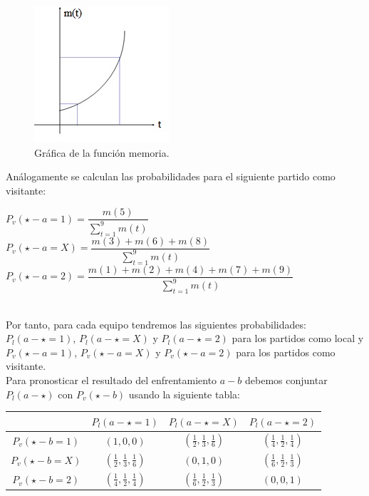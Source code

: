\begin{figure}[htb]
	\centering
	\includegraphics{images/memoria.jpg}
	\caption{Gráfica de la función memoria.} \label{fig:memoria}
\end{figure}
Análogamente se calculan las probabilidades para el siguiente partido como visitante:
\begin{center}
	$P_{v}(\star - a=1)=\dfrac{m(5)}{\sum_{t=1}^{9}m(t)}$ \ \ \ \
	$P_{v}(\star - a=X)=\dfrac{m(3)+m(6)+m(8)}{\sum_{t=1}^{9}m(t)}$\\
	$P_{v}(\star - a=2)=\dfrac{m(1)+m(2)+m(4)+m(7)+m(9)}{\sum_{t=1}^{9}m(t)}$
\end{center}
\ \\
Por tanto, para cada equipo tendremos las siguientes probabilidades:\\
$P_{l}(a - \star=1)$, $P_{l}(a - \star=X)$ y $P_{l}(a - \star=2)$ para los partidos como local y\\
$P_{v}(\star - a=1)$, $P_{v}(\star - a=X)$ y $P_{v}(\star - a=2)$ para los partidos como visitante.\\

Para pronosticar el resultado del enfrentamiento $a-b$ debemos conjuntar $P_{l}(a - \star)$ con $P_{v}(\star - b)$ usando la siguiente tabla:

\begin{center}
	\begin{tabular}{|c|c|c|c|}
	\hline  & $P_{l}(a - \star=1)$ & $P_{l}(a - \star=X)$ & $P_{l}(a - \star=2)$ \\ 
	\hline $P_{v}(\star - b=1)$ & $(1,0,0)$ & $(\frac{1}{2},\frac{1}{3},\frac{1}{6})$ & $(\frac{1}{4},\frac{1}{2},\frac{1}{4})$  \\ 
	\hline $P_{v}(\star - b=X)$ & $(\frac{1}{2},\frac{1}{3},\frac{1}{6})$ & $(0,1,0)$ & $(\frac{1}{6},\frac{1}{2},\frac{1}{3})$ \\ 
	\hline $P_{v}(\star - b=2)$ & $(\frac{1}{4},\frac{1}{2},\frac{1}{4})$ & $(\frac{1}{6},\frac{1}{2},\frac{1}{3})$ & $(0,0,1)$ \\ 
	\hline 
\end{tabular} 
\end{center}


